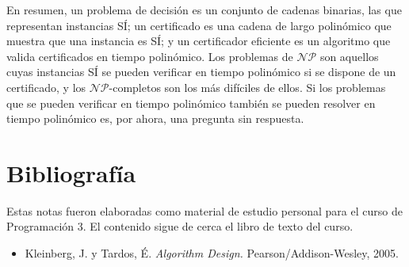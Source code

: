 \documentclass[12pt, spanish, oneside, openany]{book}
\newcommand{\NP}{\mathcal{NP}}
\theoremstyle{uprightplain}
\theoremstyle{definition}
\theoremstyle{remark}
\theoremstyle{definition}
\begin{document}
En resumen, un problema de decisión es un conjunto de cadenas binarias, las que representan instancias SÍ; un certificado es una cadena de largo polinómico que muestra que una instancia es SÍ; y un certificador eficiente es un algoritmo que valida certificados en tiempo polinómico. Los problemas de $\NP$ son aquellos cuyas instancias SÍ se pueden verificar en tiempo polinómico si se dispone de un certificado, y los $\NP$-completos son los más difíciles de ellos. Si los problemas que se pueden verificar en tiempo polinómico también se pueden resolver en tiempo polinómico es, por ahora, una pregunta sin respuesta.


\clearpage
{}
{}
\chapter*{Bibliografía}
\thispagestyle{plain}

Estas notas fueron elaboradas como material de estudio personal para el curso de Programación 3. El contenido sigue de cerca el libro de texto del curso.

\vspace{0.3cm}

\begin{itemize}[leftmargin=1.2em]
    \item Kleinberg, J. y Tardos, É.
    \textit{Algorithm Design.} Pearson/Addison-Wesley, 2005.
\end{itemize}
\end{document}
